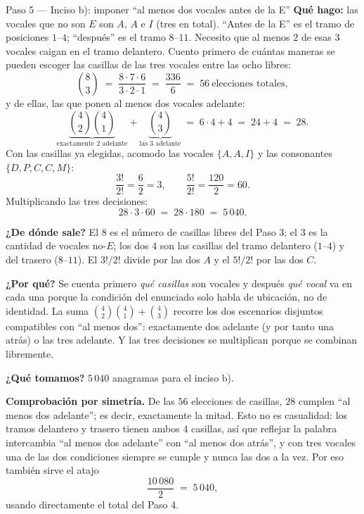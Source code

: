 \documentclass[11pt]{article}
\begin{document}
\begin{paso}{Paso 5 --- Inciso b): imponer ``al menos dos vocales antes de la E''}
\textbf{Qué hago:} las vocales que no son $E$ son $A$, $A$ e $I$ (tres en total). ``Antes de la E'' es el
tramo de posiciones $1$--$4$; ``después'' es el tramo $8$--$11$. Necesito que al menos $2$ de esas $3$
vocales caigan en el tramo delantero. Cuento primero de cuántas maneras se pueden escoger las casillas de las
tres vocales entre las ocho libres:
\[
\binom{8}{3} \;=\; \frac{8\cdot7\cdot6}{3\cdot2\cdot1} \;=\; \frac{336}{6} \;=\; 56 \ \text{elecciones totales},
\]
y de ellas, las que ponen al menos dos vocales adelante:
\[
\underbrace{\binom{4}{2}\binom{4}{1}}_{\text{exactamente 2 adelante}} + \underbrace{\binom{4}{3}}_{\text{las 3 adelante}}
\;=\; 6\cdot 4 + 4 \;=\; 24 + 4 \;=\; 28 .
\]
Con las casillas ya elegidas, acomodo las vocales $\{A,A,I\}$ y las consonantes $\{D,P,C,C,M\}$:
\[
\frac{3!}{2!} = \frac{6}{2} = 3, \qquad \frac{5!}{2!} = \frac{120}{2} = 60 .
\]
Multiplicando las tres decisiones:
\[
28\cdot 3\cdot 60 \;=\; 28\cdot 180 \;=\; 5\,040 .
\]

\textbf{¿De dónde sale?} El $8$ es el número de casillas libres del Paso 3; el $3$ es la cantidad de vocales
no-$E$; los dos $4$ son las casillas del tramo delantero ($1$--$4$) y del trasero ($8$--$11$). El $3!/2!$
divide por las dos $A$ y el $5!/2!$ por las dos $C$.

\textbf{¿Por qué?} Se cuenta primero \emph{qué casillas} son vocales y después \emph{qué vocal} va en cada
una porque la condición del enunciado solo habla de ubicación, no de identidad. La suma
$\binom{4}{2}\binom{4}{1}+\binom{4}{3}$ recorre los dos escenarios disjuntos compatibles con ``al menos
dos'': exactamente dos adelante (y por tanto una atrás) o las tres adelante. Y las tres decisiones se
multiplican porque se combinan libremente.

\textbf{¿Qué tomamos?} $5\,040$ anagramas para el inciso b).
\end{paso}

\begin{nota}
\textbf{Comprobación por simetría.} De las $56$ elecciones de casillas, $28$ cumplen ``al menos dos
adelante''; es decir, exactamente la mitad. Esto no es casualidad: los tramos delantero y trasero tienen
ambos $4$ casillas, así que reflejar la palabra intercambia ``al menos dos adelante'' con ``al menos dos
atrás'', y con tres vocales una de las dos condiciones siempre se cumple y nunca las dos a la vez. Por eso
también sirve el atajo
\[
\frac{10\,080}{2} \;=\; 5\,040 ,
\]
usando directamente el total del Paso 4.
\end{nota}
\end{document}
